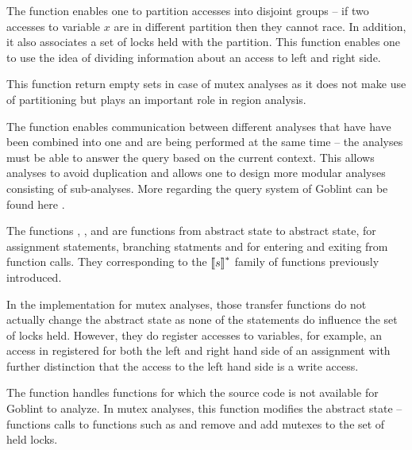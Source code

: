 \documentclass[..thesis.tex]{subfiles}
\begin{document}
The  function enables one to partition accesses into disjoint groups -- if two accesses to variable $x$ are in different partition then they cannot race. In addition, it also associates a set of locks held with the partition. This function enables one to use the idea of dividing information about an access to left and right side.

This function return empty sets in case of mutex analyses as it does not make use of partitioning but plays an important role in region analysis.


The  function enables communication between different analyses that have have been combined into one and are being performed at the same time -- 
the analyses must be able to answer the query based on the current context. This allows analyses to avoid duplication and allows one to design more modular analyses consisting of sub-analyses. More regarding the query system of Goblint can be found here .

The functions , ,  and  are functions from abstract state to abstract state, for assignment statements,
branching statments and for entering and exiting from function calls. They corresponding to the $\left\llbracket s \right\rrbracket^{*}$ family of functions previously introduced.

In the implementation for mutex analyses, those transfer functions do not actually change the abstract state as none of the statements do influence the set of locks held.
However, they do register accesses to variables, for example, an access in registered for both the left and right hand side of an assignment with further distinction
that the access to the left hand side is a write access.

The  function handles functions for which the source code is not available for Goblint to analyze. In mutex analyses,
this function modifies the abstract state -- functions calls to functions such as  and  
remove and add mutexes to the set of held locks.
\end{document}
